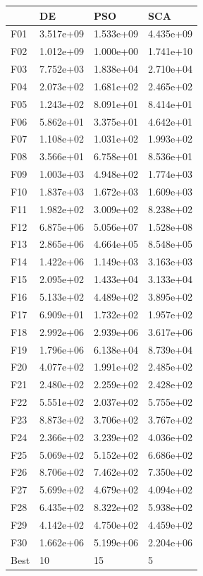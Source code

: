 \begin{tabular}{llll}
\toprule
{} &         DE &        PSO &        SCA \\
\midrule
F01  &  3.517e+09 &  1.533e+09 &  4.435e+09 \\
F02  &  1.012e+09 &  1.000e+00 &  1.741e+10 \\
F03  &  7.752e+03 &  1.838e+04 &  2.710e+04 \\
F04  &  2.073e+02 &  1.681e+02 &  2.465e+02 \\
F05  &  1.243e+02 &  8.091e+01 &  8.414e+01 \\
F06  &  5.862e+01 &  3.375e+01 &  4.642e+01 \\
F07  &  1.108e+02 &  1.031e+02 &  1.993e+02 \\
F08  &  3.566e+01 &  6.758e+01 &  8.536e+01 \\
F09  &  1.003e+03 &  4.948e+02 &  1.774e+03 \\
F10  &  1.837e+03 &  1.672e+03 &  1.609e+03 \\
F11  &  1.982e+02 &  3.009e+02 &  8.238e+02 \\
F12  &  6.875e+06 &  5.056e+07 &  1.528e+08 \\
F13  &  2.865e+06 &  4.664e+05 &  8.548e+05 \\
F14  &  1.422e+06 &  1.149e+03 &  3.163e+03 \\
F15  &  2.095e+02 &  1.433e+04 &  3.133e+04 \\
F16  &  5.133e+02 &  4.489e+02 &  3.895e+02 \\
F17  &  6.909e+01 &  1.732e+02 &  1.957e+02 \\
F18  &  2.992e+06 &  2.939e+06 &  3.617e+06 \\
F19  &  1.796e+06 &  6.138e+04 &  8.739e+04 \\
F20  &  4.077e+02 &  1.991e+02 &  2.485e+02 \\
F21  &  2.480e+02 &  2.259e+02 &  2.428e+02 \\
F22  &  5.551e+02 &  2.037e+02 &  5.755e+02 \\
F23  &  8.873e+02 &  3.706e+02 &  3.767e+02 \\
F24  &  2.366e+02 &  3.239e+02 &  4.036e+02 \\
F25  &  5.069e+02 &  5.152e+02 &  6.686e+02 \\
F26  &  8.706e+02 &  7.462e+02 &  7.350e+02 \\
F27  &  5.699e+02 &  4.679e+02 &  4.094e+02 \\
F28  &  6.435e+02 &  8.322e+02 &  5.938e+02 \\
F29  &  4.142e+02 &  4.750e+02 &  4.459e+02 \\
F30  &  1.662e+06 &  5.199e+06 &  2.204e+06 \\
Best &         10 &         15 &          5 \\
\bottomrule
\end{tabular}

